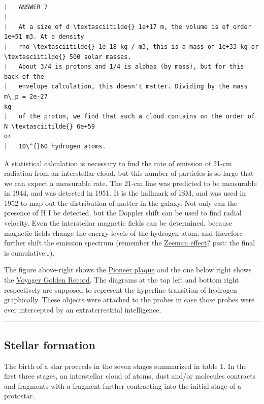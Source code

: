 \documentclass[11pt]{article}
\begin{document}
    \begin{Verbatim}[commandchars=\\\{\}]

|   ANSWER 7
|
|   At a size of d \textasciitilde{} 1e+17 m, the volume is of order 1e+51 m3. At a density
|   rho \textasciitilde{} 1e-18 kg / m3, this is a mass of 1e+33 kg or \textasciitilde{} 500 solar masses.
|   About 3/4 is protons and 1/4 is alphas (by mass), but for this back-of-the-
|   envelope calculation, this doesn't matter. Dividing by the mass m\_p = 2e-27
kg
|   of the proton, we find that such a cloud contains on the order of N \textasciitilde{} 6e+59
or
|   10\^{}60 hydrogen atoms.

    \end{Verbatim}

    A statistical calculation is necessary to find the rate of emission of
21-cm radiation from an interstellar cloud, but this number of particles
is so large that we can expect a measurable rate. The 21-cm line was
predicted to be measurable in 1944, and was detected in 1951. It is the
hallmark of ISM, and was used in 1952 to map out the distribution of
matter in the galaxy. Not only can the presence of H I be detected, but
the Doppler shift can be used to find radial velocity. Even the
interstellar magnetic fields can be determined, because magnetic fields
change the energy levels of the hydrogen atom, and therefore further
shift the emission spectrum (remember the
\href{https://en.wikipedia.org/wiki/Zeeman_effect}{Zeeman effect}? psst:
the final is cumulative\ldots{}).

The figure above-right shows the
\href{https://en.wikipedia.org/wiki/Pioneer_plaque}{Pioneer plaque} and
the one below right shows the
\href{https://en.wikipedia.org/wiki/Voyager_Golden_Record}{Voyager
Golden Record}. The diagrams at the top left and bottom right
respectively are supposed to represent the hyperfine transition of
hydrogen graphically. These objects were attached to the probes in case
those probes were ever intercepted by an extraterrestrial intelligence.

\begin{center}\rule{0.5\linewidth}{0.5pt}\end{center}

\subsection{Stellar formation}\label{stellar-formation}

The birth of a star proceeds in the seven stages summarized in table 1.
In the first three stages, an interstellar cloud of atoms, dust and/or
molecules contracts and fragments with a fragment further contracting
into the initial stage of a protostar.
\end{document}
